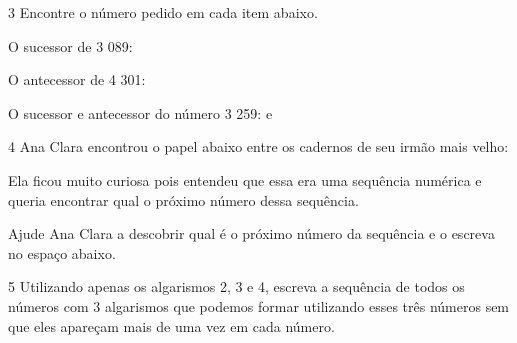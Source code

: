 
\num{3} Encontre o número pedido em cada item abaixo.

\begin{escolha}
\item
  O sucessor de 3 089: \preencher{}
\item
  O antecessor de 4 301: \preencher{}
\item
  O sucessor e antecessor do número 3 259: \preencher{} e \preencher{}
\end{escolha}


\num{4} Ana Clara encontrou o papel abaixo entre os cadernos de seu irmão mais velho:


Ela ficou muito curiosa pois entendeu que essa era uma sequência
numérica e queria encontrar qual o próximo número dessa sequência.

Ajude Ana Clara a descobrir qual é o próximo número da sequência e o
escreva no espaço abaixo.



\num{5} Utilizando apenas os algarismos 2, 3 e 4, escreva a sequência de
todos os números com 3 algarismos que podemos formar utilizando esses
três números sem que eles apareçam mais de uma vez em cada número.

